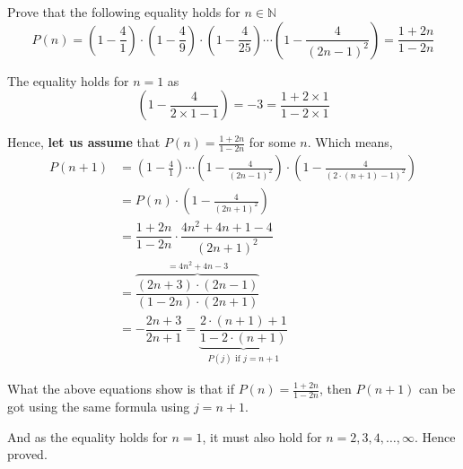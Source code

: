 
\question[4] Prove that the following equality holds for $n\in\mathbb{N}$ 
\[ P(n) = \left(1-\frac{4}{1} \right)\cdot\left( 1-\frac{4}{9}\right)\cdot
\left( 1-\frac{4}{25} \right)\cdots\left(1-\frac{4}{(2n-1)^2}\right) = \dfrac{1+2n}{1-2n}\] 

\insertQR{}

\begin{solution}[\halfpage]
  The equality holds for $n=1$ as
  \[ \left( 1-\frac{4}{2\times 1 - 1}\right) = -3 = \frac{1+2\times 1}{1-2\times 1} \]
  
  Hence, \textbf{let us assume} that $P(n) = \frac{1+2n}{1-2n}$ for some $n$. Which means, 
  \begin{align}
    P(n+1) &= \left( 1-\frac{4}{1} \right)\cdots\left(1-\frac{4}{(2n-1)^2} \right)\cdot\left( 1-\frac{4}{(2\cdot(n+1) - 1)^2} \right) \\
           &= P(n)\cdot\left( 1-\frac{4}{(2n+1)^2}\right) \\
           &= \dfrac{1+2n}{1-2n}\cdot\dfrac{4n^2+4n+1-4}{(2n+1)^2} \\
           &= \overbrace{\dfrac{(2n+3)\cdot(2n-1)}{(1-2n)\cdot (2n+1)}}^{= 4n^2+4n-3} \\
           &= -\dfrac{2n+3}{2n+1} = \underbrace{\dfrac{2\cdot(n+1) + 1}{1-2\cdot(n+1)}}_{P(j)\text{ if } j=n+1 }
  \end{align}

  What the above equations show is that if $P(n) = \frac{1+2n}{1-2n}$, then $P(n+1)$ can be got 
  using the same formula using $j=n+1$. 

  And as the equality holds for $n=1$, it must also hold for $n=2,3,4,\ldots,\infty$. Hence proved.
\end{solution}
